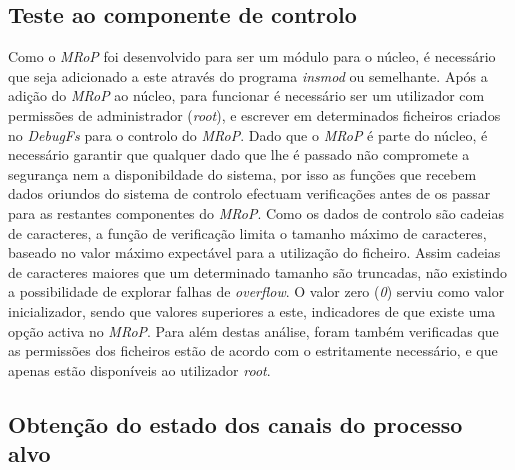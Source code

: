 \subsection{Teste ao componente de controlo}

Como o \textit{MRoP} foi desenvolvido para ser um módulo para o núcleo, é necessário que seja adicionado a este através do programa \textit{insmod} ou semelhante.
Após a adição do \textit{MRoP} ao núcleo, para funcionar é necessário ser um utilizador com permissões de administrador (\textit{root}), e escrever em determinados ficheiros criados no \textit{DebugFs} para o controlo do \textit{MRoP}.
Dado que o \textit{MRoP} é parte do núcleo, é necessário garantir que qualquer dado que lhe é passado não compromete a segurança nem a disponibildade do sistema, por isso as funções que recebem dados oriundos do sistema de controlo efectuam verificações antes de os passar para as restantes componentes do \textit{MRoP}.
Como os dados de controlo são cadeias de caracteres, a função de verificação limita o tamanho máximo de caracteres, baseado no valor máximo expectável para a utilização do ficheiro.
Assim cadeias de caracteres maiores que um determinado tamanho são truncadas, não existindo a possibilidade de explorar falhas de \textit{overflow}.
O valor zero (\textit{0}) serviu como valor inicializador, sendo que valores superiores a este, indicadores de que existe uma opção activa no \textit{MRoP}.
Para além destas análise, foram também verificadas que as permissões dos ficheiros estão de acordo com o estritamente necessário, e que apenas estão disponíveis ao utilizador \textit{root}.

\subsection{Obtenção do estado dos canais do processo alvo}

